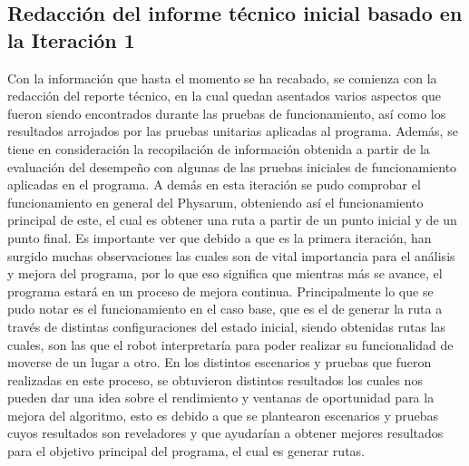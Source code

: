 \subsection{Redacci\'on del informe t\'ecnico inicial basado en la Iteraci\'on 1}
    Con la informaci\'on que hasta el momento se ha recabado, se
        comienza con la redacci\'on del reporte t\'ecnico, en la cual
        quedan asentados varios aspectos que fueron siendo
        encontrados durante las pruebas de funcionamiento, as\'i
        como los resultados arrojados por las pruebas unitarias
        aplicadas al programa.
        \vskip 0.5cm
    Adem\'as, se tiene en consideraci\'on la recopilaci\'on de
        informaci\'on obtenida a partir de la evaluaci\'on del
        desempe\~no con algunas de las pruebas iniciales de
        funcionamiento aplicadas en el programa.
        \vskip 0.5cm
    A dem\'as en esta iteraci\'on se pudo comprobar el funcionamiento en
        general del Physarum, obteniendo as\'i el funcionamiento
        principal de este, el cual es obtener una ruta a partir de un
        punto inicial y de un punto final. Es importante ver que
        debido a que es la primera iteraci\'on, han surgido muchas
        observaciones las cuales son de vital importancia para el
        an\'alisis y mejora del programa, por lo que eso significa que
        mientras m\'as se avance, el programa estar\'a en un proceso de
        mejora continua.
    \vskip 0.5cm
    Principalmente lo que se pudo notar es el funcionamiento en
        el caso base, que es el de generar la ruta a trav\'es de distintas
        configuraciones del estado inicial, siendo obtenidas rutas las
        cuales, son las que el robot interpretar\'ia para poder realizar
        su funcionalidad de moverse de un lugar a otro.
    \vskip 0.5cm
    En los distintos escenarios y pruebas que fueron realizadas
        en este proceso, se obtuvieron distintos resultados los cuales
        nos pueden dar una idea sobre el rendimiento y ventanas de
        oportunidad para la mejora del algoritmo, esto es debido a que se plantearon escenarios y pruebas cuyos resultados son
        reveladores y que ayudar\'ian a obtener mejores resultados
        para el objetivo principal del programa, el cual es generar
        rutas.
    \vskip 0.5cm